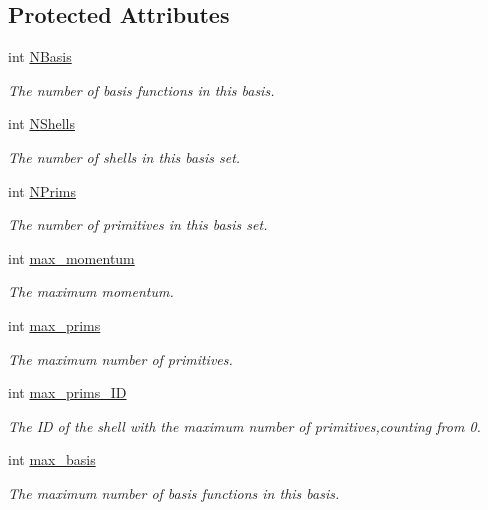 \subsection*{Protected Attributes}
\begin{DoxyCompactItemize}
\item 
int \hyperlink{classJKBuilder_1_1BasisSet_a41e2bc1e52da2859eabe6586e4451663}{NBasis}
\begin{DoxyCompactList}\small\item\em The number of basis functions in this basis. \item\end{DoxyCompactList}\item 
int \hyperlink{classJKBuilder_1_1BasisSet_a9f13901f058284051a35aabd9d69c6d5}{NShells}
\begin{DoxyCompactList}\small\item\em The number of shells in this basis set. \item\end{DoxyCompactList}\item 
int \hyperlink{classJKBuilder_1_1BasisSet_ad30990632a28f27018d2b497e263caf1}{NPrims}
\begin{DoxyCompactList}\small\item\em The number of primitives in this basis set. \item\end{DoxyCompactList}\item 
int \hyperlink{classJKBuilder_1_1BasisSet_a8fce14d0246c865eea79bf2869b02997}{max\_\-momentum}
\begin{DoxyCompactList}\small\item\em The maximum momentum. \item\end{DoxyCompactList}\item 
int \hyperlink{classJKBuilder_1_1BasisSet_aeb188680b23f4d32ea9a65468e5ba71d}{max\_\-prims}
\begin{DoxyCompactList}\small\item\em The maximum number of primitives. \item\end{DoxyCompactList}\item 
int \hyperlink{classJKBuilder_1_1BasisSet_acdabb925780e7292114dfa2ace8b9d8e}{max\_\-prims\_\-ID}
\begin{DoxyCompactList}\small\item\em The ID of the shell with the maximum number of primitives,counting from 0. \item\end{DoxyCompactList}\item 
int \hyperlink{classJKBuilder_1_1BasisSet_af29e85e56ea63952fc7a1ede8d10426f}{max\_\-basis}
\begin{DoxyCompactList}\small\item\em The maximum number of basis functions in this basis. \item\end{DoxyCompactList}\end{DoxyCompactItemize}


